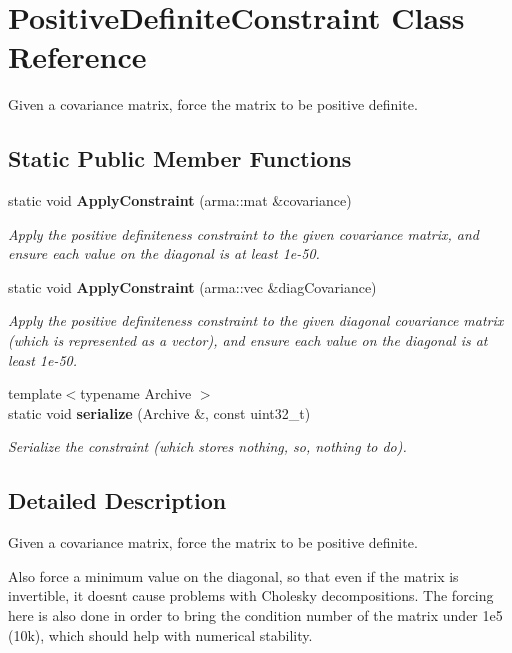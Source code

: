 \section{Positive\+Definite\+Constraint Class Reference}
\label{classmlpack_1_1gmm_1_1PositiveDefiniteConstraint}


Given a covariance matrix, force the matrix to be positive definite.  


\subsection*{Static Public Member Functions}
\begin{DoxyCompactItemize}
\item 
static void \textbf{ Apply\+Constraint} (arma\+::mat \&covariance)
\begin{DoxyCompactList}\small\item\em Apply the positive definiteness constraint to the given covariance matrix, and ensure each value on the diagonal is at least 1e-\/50. \end{DoxyCompactList}\item 
static void \textbf{ Apply\+Constraint} (arma\+::vec \&diag\+Covariance)
\begin{DoxyCompactList}\small\item\em Apply the positive definiteness constraint to the given diagonal covariance matrix (which is represented as a vector), and ensure each value on the diagonal is at least 1e-\/50. \end{DoxyCompactList}\item 
{\footnotesize template$<$typename Archive $>$ }\\static void \textbf{ serialize} (Archive \&, const uint32\+\_\+t)
\begin{DoxyCompactList}\small\item\em Serialize the constraint (which stores nothing, so, nothing to do). \end{DoxyCompactList}\end{DoxyCompactItemize}


\subsection{Detailed Description}
Given a covariance matrix, force the matrix to be positive definite. 

Also force a minimum value on the diagonal, so that even if the matrix is invertible, it doesn\textquotesingle{}t cause problems with Cholesky decompositions. The forcing here is also done in order to bring the condition number of the matrix under 1e5 (10k), which should help with numerical stability. 

